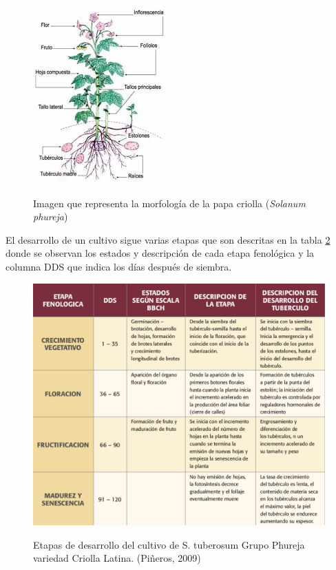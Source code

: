 \begin{figure}[h!]
	\caption{Imagen que representa la morfología de la papa criolla (\textit{Solanum phureja})}
	\centering
	\includegraphics[scale=0.7]{planta.jpeg}
	\label{fig:planta}
\end{figure}

El desarrollo de un cultivo sigue varias etapas que son descritas en la tabla \ref{fig:cultivo} donde se observan los estados y descripción de cada etapa fenológica y la columna DDS que indica los días después de siembra.\\

\begin{figure}[h!]
	\caption{Etapas de desarrollo del cultivo de S. tuberosum Grupo Phureja variedad Criolla Latina. (Piñeros, 2009)}
	\centering
	\includegraphics[scale=0.8]{papas.png}
	\label{fig:cultivo}
\end{figure}

